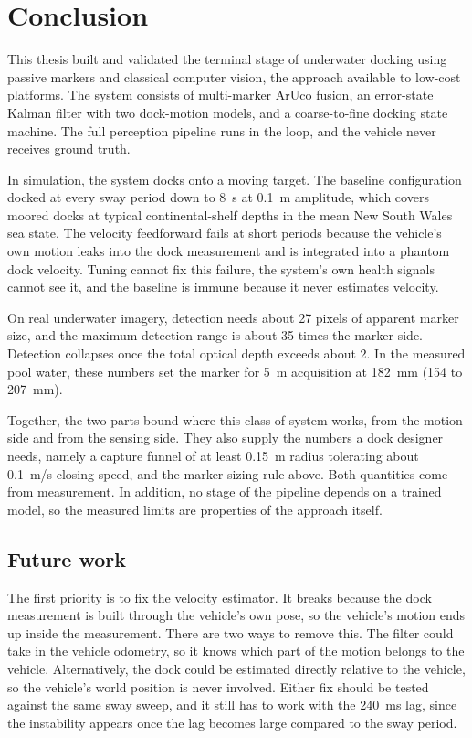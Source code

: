 \section{Conclusion}
\label{sec:conclusion}

This thesis built and validated the terminal stage of underwater docking using passive markers and classical computer vision, the approach available to low-cost platforms. The system consists of multi-marker ArUco fusion, an error-state Kalman filter with two dock-motion models, and a coarse-to-fine docking state machine. The full perception pipeline runs in the loop, and the vehicle never receives ground truth.

In simulation, the system docks onto a moving target. The baseline configuration docked at every sway period down to 8~s at 0.1~m amplitude, which covers moored docks at typical continental-shelf depths in the mean New South Wales sea state. The velocity feedforward fails at short periods because the vehicle's own motion leaks into the dock measurement and is integrated into a phantom dock velocity. Tuning cannot fix this failure, the system's own health signals cannot see it, and the baseline is immune because it never estimates velocity.

On real underwater imagery, detection needs about 27 pixels of apparent marker size, and the maximum detection range is about 35 times the marker side. Detection collapses once the total optical depth exceeds about 2. In the measured pool water, these numbers set the marker for 5~m acquisition at 182~mm (154 to 207~mm).

Together, the two parts bound where this class of system works, from the motion side and from the sensing side. They also supply the numbers a dock designer needs, namely a capture funnel of at least 0.15~m radius tolerating about 0.1~m/s closing speed, and the marker sizing rule above. Both quantities come from measurement. In addition, no stage of the pipeline depends on a trained model, so the measured limits are properties of the approach itself.

\subsection{Future work}
\label{sec:future-work}

The first priority is to fix the velocity estimator. It breaks because the dock measurement is built through the vehicle's own pose, so the vehicle's motion ends up inside the measurement. There are two ways to remove this. The filter could take in the vehicle odometry, so it knows which part of the motion belongs to the vehicle. Alternatively, the dock could be estimated directly relative to the vehicle, so the vehicle's world position is never involved. Either fix should be tested against the same sway sweep, and it still has to work with the 240~ms lag, since the instability appears once the lag becomes large compared to the sway period.

